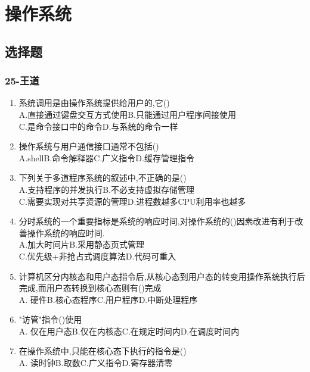 \documentclass[12pt, a4paper, oneside, UTF8]{ctexbook}
\begin{document}
% 
\else
\fi
\chapter{操作系统}
\section{选择题}

\subsection{25-王道}
\begin{enumerate}
    \item 系统调用是由操作系统提供给用户的,它() \\
    A.直接通过键盘交互方式使用\qquad B.只能通过用户程序间接使用 \\
    C.是命令接口中的命令\qquad D.与系统的命令一样
    
    \item 操作系统与用户通信接口通常不包括() \\
    A.shell\qquad B.命令解释器\qquad C.广义指令\qquad D.缓存管理指令 

    \item 下列关于多道程序系统的叙述中,不正确的是() \\
    A.支持程序的并发执行\qquad B.不必支持虚拟存储管理 \\
    C.需要实现对共享资源的管理\qquad D.进程数越多CPU利用率也越多 

    \item 分时系统的一个重要指标是系统的响应时间,对操作系统的()因素改进有利于改善操作系统的响应时间. \\
    A.加大时间片\qquad B.采用静态页式管理 \\
    C.优先级+非抢占式调度算法\qquad D.代码可重入 

    \item 计算机区分内核态和用户态指令后,从核心态到用户态的转变用操作系统执行后完成,而用户态转换到核心态则有()完成 \\
    A. 硬件\qquad B.核心态程序\qquad C.用户程序\qquad D.中断处理程序

    \item "访管"指令()使用 \\
    A. 仅在用户态\qquad B.仅在内核态\qquad C.在规定时间内\qquad D.在调度时间内

    \item 在操作系统中,只能在核心态下执行的指令是() \\
    A. 读时钟\qquad B.取数\qquad C.广义指令\qquad D.寄存器清零


\end{enumerate}
\end{document}
